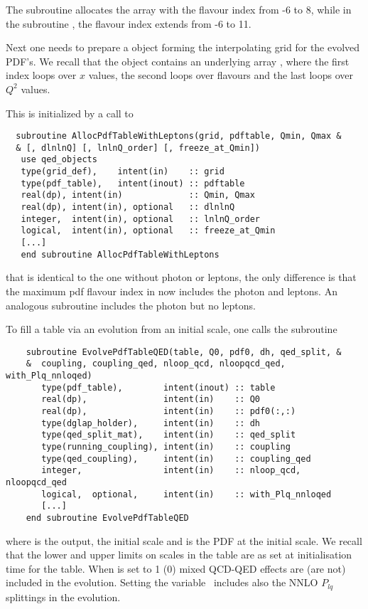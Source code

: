 The subroutine  allocates the 
array with the flavour index from -6 to 8,
while in the subroutine ,
the flavour index extends from -6 to 11.



Next one needs to prepare a  object forming the
interpolating grid for the evolved PDF's. We recall that the
 object contains an underlying array ,
where the first index loops over $x$ values, the second loops over
flavours and the last loops over $Q^2$ values.


This is initialized by a call to 
\begin{lstlisting}
  subroutine AllocPdfTableWithLeptons(grid, pdftable, Qmin, Qmax & 
  & [, dlnlnQ] [, lnlnQ_order] [, freeze_at_Qmin])
   use qed_objects
   type(grid_def),    intent(in)    :: grid
   type(pdf_table),   intent(inout) :: pdftable
   real(dp), intent(in)             :: Qmin, Qmax
   real(dp), intent(in), optional   :: dlnlnQ
   integer,  intent(in), optional   :: lnlnQ_order
   logical,  intent(in), optional   :: freeze_at_Qmin
   [...]
   end subroutine AllocPdfTableWithLeptons
\end{lstlisting}
that is identical to the one without photon or leptons, the only difference is that the
maximum pdf flavour index in  now includes the photon and leptons.
%
An analogous subroutine  includes the
photon but no leptons.



To fill a table via an evolution from an initial scale, one calls the subroutine 
\begin{lstlisting}
    subroutine EvolvePdfTableQED(table, Q0, pdf0, dh, qed_split, &
    &  coupling, coupling_qed, nloop_qcd, nloopqcd_qed, with_Plq_nnloqed)
       type(pdf_table),        intent(inout) :: table
       real(dp),               intent(in)    :: Q0
       real(dp),               intent(in)    :: pdf0(:,:)
       type(dglap_holder),     intent(in)    :: dh
       type(qed_split_mat),    intent(in)    :: qed_split
       type(running_coupling), intent(in)    :: coupling
       type(qed_coupling),     intent(in)    :: coupling_qed
       integer,                intent(in)    :: nloop_qcd, nloopqcd_qed
       logical,  optional,     intent(in)    :: with_Plq_nnloqed
       [...]
    end subroutine EvolvePdfTableQED   
\end{lstlisting}
where  is the output,  the initial scale and
 is the PDF at the initial scale.
%
We recall that the lower and upper limits on 
scales in the table are as set at initialisation time for the table.
%
When  is set to 1 (0) mixed QCD-QED effects are
(are not) included in the evolution.
%
Setting the variable \ includes also the NNLO $P_{lq}$
splittings in the evolution.

